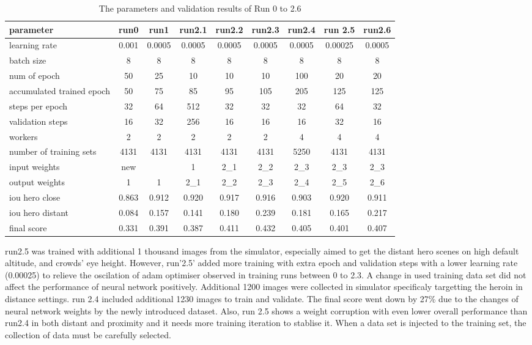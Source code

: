 \documentclass[paper=a4, fontsize=11pt]{scrartcl} %
\numberwithin{equation}{section} %
\numberwithin{figure}{section} %
\numberwithin{table}{section} %
\begin{document}
\begin{table}
	\begin{center}
		\begin{tabular}{ l | c | c | c | c | c | c | c| c }
		\hline
		parameter & run0 & run1 & run2.1 & run2.2 & run2.3 & run2.4 & run 2.5 & run2.6\\ \hline
		learning rate & 0.001 & 0.0005 & 0.0005 & 0.0005 & 0.0005 & 0.0005& 0.00025& 0.0005\\ \hline
		batch size    & 8 & 8 & 8 & 8 & 8 & 8  & 8 & 8\\ \hline
		num of epoch  & 50 & 25 & 10  &  10 &  10 & 100 & 20 & 20\\ \hline
		accumulated trained epoch & 50 & 75 & 85 & 95  & 105 & 205 & 125 & 125\\ \hline
		steps per epoch & 32 & 64 & 512 & 32 & 32 & 32 & 64 & 32\\ \hline
		validation steps & 16 & 32 & 256 & 16 & 16 & 16 & 32 & 16\\ \hline
		workers & 2 & 2 & 2 & 2 & 2 & 4 & 4 & 4 \\ \hline
		number of training sets & 4131 & 4131 & 4131 & 4131 & 4131 & 5250 & 4131 & 4131\\ \hline
		input weights & new &  & 1 & 2\_1 & 2\_2  & 2\_3 & 2\_3 & 2\_3\\ \hline
		output weights & 1 & 1 & 2\_1 & 2\_2 & 2\_3 & 2\_4 & 2\_5 & 2\_6\\
		\hline \hline
		iou hero close &0.863 & 0.912 & 0.920 & 0.917 & 0.916 & 0.903 & 0.920 & 0.911\\ \hline	  
		iou hero distant & 0.084 & 0.157 & 0.141 & 0.180 & 0.239 & 0.181 & 0.165 & 0.217\\ \hline
		final score & 0.331& 0.391 & 0.387 & 0.411 & 0.432 & 0.405 & 0.401 & 0.407\\
		\hline
		\end{tabular}
		\caption{The parameters and validation results of Run 0 to 2.6}
		\label{tab:parameters2}
	\end{center}
\end{table}

run2.5 was trained with additional 1 thousand images from the simulator, especially aimed to get the distant hero scenes on high default altitude, and crowds' eye height. However, run'2.5' added more training with extra epoch and validation steps with a lower learning rate (0.00025) to relieve the oscilation of adam optimiser observed in training runs between 0 to 2.3.
A change in used training data set did not affect the performance of neural network positively. Additional 1200 images were collected in simulator specificaly targetting the heroin in distance settings. run 2.4 included additional 1230 images to train and validate. The final score went down by 27\% due to the changes of neural network weights by the newly introduced dataset. Also, run 2.5 shows a weight corruption with even lower overall performance than run2.4 in both distant and proximity and it needs more training iteration to stablise it. When a data set is injected to the training set, the collection of data must be carefully selected.
\end{document}

